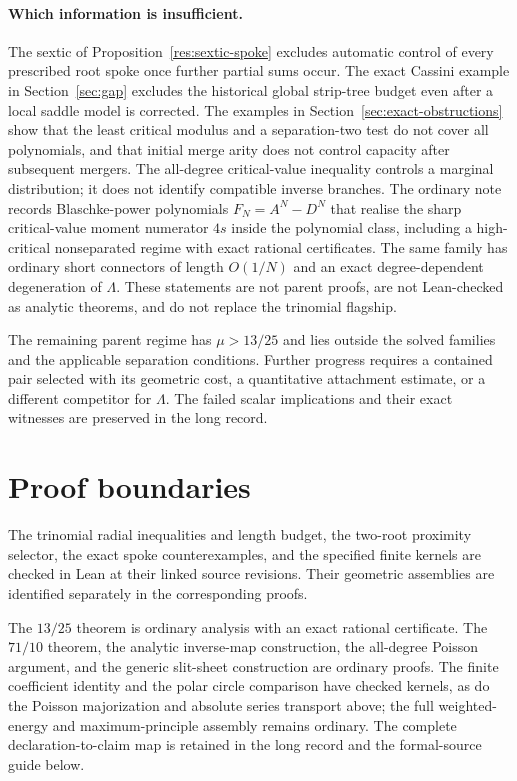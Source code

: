 \documentclass[11pt]{article}
\begin{document}
\paragraph{Which information is insufficient.}
The sextic of Proposition~\ref{res:sextic-spoke} excludes automatic control of
every prescribed root spoke once further partial sums occur.  The exact
Cassini example in Section~\ref{sec:gap} excludes the historical global
strip-tree budget even after a local saddle model is corrected.  The examples
in Section~\ref{sec:exact-obstructions} show that the least critical modulus
and a separation-two test do not cover all polynomials, and that initial merge
arity does not control capacity after subsequent mergers.  The all-degree
critical-value inequality controls a marginal distribution; it does not
identify compatible inverse branches.
The ordinary note
records Blaschke-power polynomials $F_N=A^N-D^N$ that realise the sharp
critical-value moment numerator $4s$ inside the polynomial class, including
a high-critical nonseparated regime with exact rational certificates.  The
same family has ordinary short connectors of length $O(1/N)$ and an exact
degree-dependent degeneration of $\Lambda$.  These statements are not
parent proofs, are not Lean-checked as analytic theorems, and do not
replace the trinomial flagship.

The remaining parent regime has $\mu>13/25$ and lies outside the solved
families and the applicable separation conditions.  Further progress requires
a contained pair selected with its geometric cost, a quantitative attachment
estimate, or a different competitor for $\Lambda$.  The failed scalar
implications and their exact witnesses are preserved in the long record.

\section{Proof boundaries}\label{sec:evidence-ledger}

The trinomial radial inequalities and length budget, the two-root proximity
selector, the exact spoke counterexamples, and the specified finite kernels
are checked in Lean at their linked source revisions.  Their geometric
assemblies are identified separately in the corresponding proofs.

The $13/25$ theorem is ordinary analysis with an exact rational certificate.
The $71/10$ theorem, the analytic inverse-map construction, the all-degree
Poisson argument, and the generic slit-sheet construction are ordinary
proofs.  The finite coefficient identity and the polar circle comparison
have checked kernels, as do the Poisson majorization and absolute series
transport above; the full weighted-energy and maximum-principle assembly
remains ordinary.  The complete declaration-to-claim map is retained in the
long record and the formal-source guide below.
\end{document}
